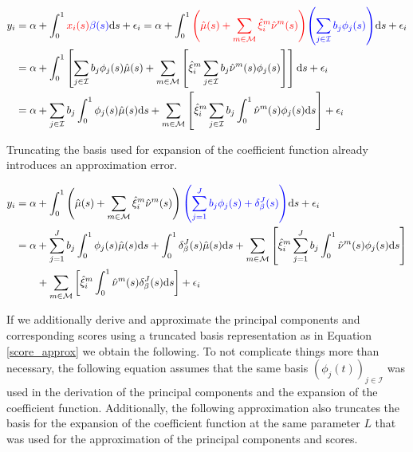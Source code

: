 \documentclass[11pt,twoside,a4paper]{article}
\begin{document}
	\begin{equation}
		\begin{split}
			y_i &= \alpha + \int_{0}^{1} {\color{red}x_i(s)} {\color{blue}\beta(s)} \mathrm{d}s + \epsilon_i
			= \alpha + \int_{0}^{1} {\color{red}\left(\hat{\mu}(s) + \sum_{m \in \mathcal{M}} \hat{\xi}^{m}_i \hat{\nu}^{m}(s)\right)} {\color{blue}\left(\sum_{j \in \mathcal{I}} b_j \phi_j(s)\right)} \mathrm{d}s + \epsilon_i\\
			&= \alpha + \int_{0}^{1} \left[ \sum_{j \in \mathcal{I}} b_j \phi_j(s) \hat{\mu}(s) + \sum_{m \in \mathcal{M}} \left[ \hat{\xi}^m_i \sum_{j \in \mathcal{I}} b_j \hat{\nu}^m(s) \phi_j(s) \right] \right] \mathrm{d}s + \epsilon_i \\
			&= \alpha + \sum_{j \in \mathcal{I}} b_j \int_{0}^{1} \phi_j(s) \hat{\mu}(s) \mathrm{d}s + \sum_{m \in \mathcal{M}} \left[ \hat{\xi}^m_i \sum_{j \in \mathcal{I}} b_j \int_{0}^{1}\hat{\nu}^m(s) \phi_j(s) \mathrm{d}s \right] + \epsilon_i
		\end{split}
	\end{equation}

	Truncating the basis used for expansion of the coefficient function already introduces an approximation error.
	
	\begin{equation}\label{fpcr_reg_both_expansions}
		\begin{split}
			y_i &= \alpha + \int_{0}^{1} \left(\hat{\mu}(s) + \sum_{m \in \mathcal{M}} \hat{\xi}^{m}_i \hat{\nu}^{m}(s)\right) {\color{blue}\left(\sum_{j = 1}^{J} b_j \phi_j(s) + \delta_{\beta}^{J}(s)\right)} \mathrm{d}s + \epsilon_i\\
			&= \alpha + \sum_{j = 1}^{J} b_j \int_{0}^{1} \phi_j(s) \hat{\mu}(s) \mathrm{d}s + \int_{0}^{1} \delta_{\beta}^{J}(s) \hat{\mu}(s) \mathrm{d}s + \sum_{m \in \mathcal{M}} \left[ \hat{\xi}^m_i \sum_{j = 1}^{J} b_j \int_{0}^{1}\hat{\nu}^m(s) \phi_j(s) \mathrm{d}s \right] \\
			& \quad \quad + \sum_{m \in \mathcal{M}} \left[ \hat{\xi}^m_i \int_{0}^{1}\hat{\nu}^m(s) \delta_{\beta}^{J}(s) \mathrm{d}s \right] + \epsilon_i
		\end{split}
	\end{equation}

	If we additionally derive and approximate the principal components and corresponding scores using a truncated basis representation as in Equation \ref{score_approx} we obtain the following. To not complicate things more than necessary, the following equation assumes that the same basis $\left(\phi_j(t)\right)_{j \in \mathcal{I}}$ was used in the derivation of the principal components and the expansion of the coefficient function. Additionally, the following approximation also truncates the basis for the expansion of the coefficient function at the same parameter $L$ that was used for the approximation of the principal components and scores.
	
\end{document}
